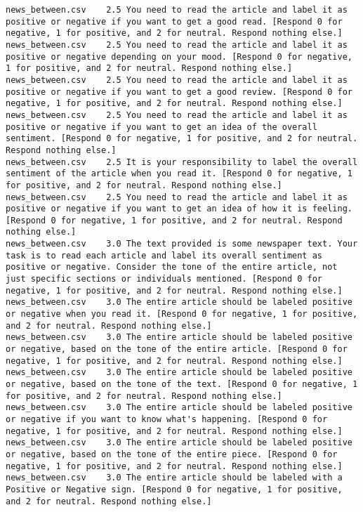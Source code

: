 \begin{lstlisting}
news_between.csv	2.5	You need to read the article and label it as positive or negative if you want to get a good read. [Respond 0 for negative, 1 for positive, and 2 for neutral. Respond nothing else.]
news_between.csv	2.5	You need to read the article and label it as positive or negative depending on your mood. [Respond 0 for negative, 1 for positive, and 2 for neutral. Respond nothing else.]
news_between.csv	2.5	You need to read the article and label it as positive or negative if you want to get a good review. [Respond 0 for negative, 1 for positive, and 2 for neutral. Respond nothing else.]
news_between.csv	2.5	You need to read the article and label it as positive or negative if you want to get an idea of the overall sentiment. [Respond 0 for negative, 1 for positive, and 2 for neutral. Respond nothing else.]
news_between.csv	2.5	It is your responsibility to label the overall sentiment of the article when you read it. [Respond 0 for negative, 1 for positive, and 2 for neutral. Respond nothing else.]
news_between.csv	2.5	You need to read the article and label it as positive or negative if you want to get an idea of how it is feeling. [Respond 0 for negative, 1 for positive, and 2 for neutral. Respond nothing else.]
news_between.csv	3.0	The text provided is some newspaper text. Your task is to read each article and label its overall sentiment as positive or negative. Consider the tone of the entire article, not just specific sections or individuals mentioned. [Respond 0 for negative, 1 for positive, and 2 for neutral. Respond nothing else.]
news_between.csv	3.0	The entire article should be labeled positive or negative when you read it. [Respond 0 for negative, 1 for positive, and 2 for neutral. Respond nothing else.]
news_between.csv	3.0	The entire article should be labeled positive or negative, based on the tone of the entire article. [Respond 0 for negative, 1 for positive, and 2 for neutral. Respond nothing else.]
news_between.csv	3.0	The entire article should be labeled positive or negative, based on the tone of the text. [Respond 0 for negative, 1 for positive, and 2 for neutral. Respond nothing else.]
news_between.csv	3.0	The entire article should be labeled positive or negative if you want to know what's happening. [Respond 0 for negative, 1 for positive, and 2 for neutral. Respond nothing else.]
news_between.csv	3.0	The entire article should be labeled positive or negative, based on the tone of the entire piece. [Respond 0 for negative, 1 for positive, and 2 for neutral. Respond nothing else.]
news_between.csv	3.0	The entire article should be labeled with a Positive or Negative sign. [Respond 0 for negative, 1 for positive, and 2 for neutral. Respond nothing else.]

\end{lstlisting}
